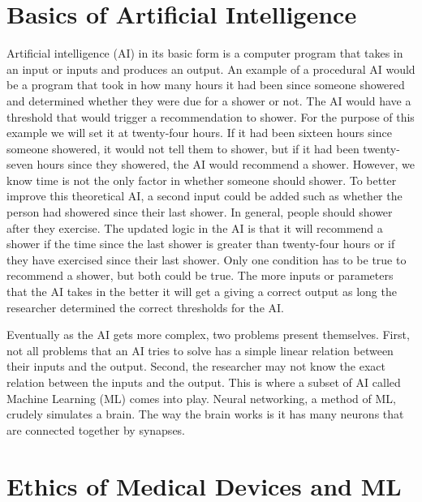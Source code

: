 \documentclass[]{article}
\begin{document}
	\section{Basics of Artificial Intelligence}\label{introtoai}
		Artificial intelligence (AI) in its basic form is a computer program that takes in an input or inputs and produces an output. An example of a procedural AI would be a program that took in how many hours it had been since someone showered and determined whether they were due for a shower or not. The AI would have a threshold that would trigger a recommendation to shower. For the purpose of this example we will set it at twenty-four hours. If it had been sixteen hours since someone showered, it would not tell them to shower, but if it had been twenty-seven hours since they showered, the AI would recommend a shower. However, we know time is not the only factor in whether someone should shower. To better improve this theoretical AI, a second input could be added such as whether the person had showered since their last shower. In general, people should shower after they exercise. The updated logic in the AI is that it will recommend a shower if the time since the last shower is greater than twenty-four hours or if they have exercised since their last shower. Only one condition has to be true to recommend a shower, but both could be true. The more inputs or parameters that the AI takes in the better it will get a giving a correct output as long the researcher determined the correct thresholds for the AI.

		Eventually as the AI gets more complex, two problems present themselves. First, not all problems that an AI tries to solve has a simple linear relation between their inputs and the output. Second, the researcher may not know the exact relation between the inputs and the output. This is where a subset of AI called Machine Learning (ML) comes into play. Neural networking, a method of ML, crudely simulates a brain. The way the brain works is it has many neurons that are connected together by synapses.



		

	\section{Ethics of Medical Devices and ML}\label{ethics}
\end{document}
